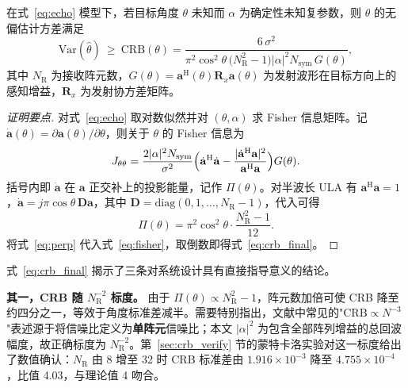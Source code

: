 \begin{theorem}[角度估计克拉美罗下界]
\label{thm:crb}
在式~\eqref{eq:echo} 模型下，若目标角度 $\theta$ 未知而 $\alpha$ 为确定性未知复参数，则 $\theta$ 的无偏估计方差满足
\begin{equation}
  \mathrm{Var}(\hat{\theta})\ \ge\ \mathrm{CRB}(\theta)
  =\frac{6\,\sigma^{2}}{\pi^{2}\cos^{2}\theta\,\bigl(N_{\mathrm{R}}^{2}-1\bigr)\lvert\alpha\rvert^{2}N_{\mathrm{sym}}\,G(\theta)},
  \label{eq:crb_final}
\end{equation}
其中 $N_{\mathrm{R}}$ 为接收阵元数，$G(\theta)=\mathbf{a}^{\mathrm{H}}(\theta)\mathbf{R}_{x}\mathbf{a}(\theta)$ 为发射波形在目标方向上的感知增益，$\mathbf{R}_{x}$ 为发射协方差矩阵。
\end{theorem}

\begin{proof}[证明要点]
对式~\eqref{eq:echo} 取对数似然并对 $(\theta,\alpha)$ 求 Fisher 信息矩阵。记 $\dot{\mathbf{a}}(\theta)=\partial\mathbf{a}(\theta)/\partial\theta$，则关于 $\theta$ 的 Fisher 信息为
\begin{equation}
  J_{\theta\theta}=\frac{2\lvert\alpha\rvert^{2}N_{\mathrm{sym}}}{\sigma^{2}}
  \Bigl(\dot{\mathbf{a}}^{\mathrm{H}}\dot{\mathbf{a}}-\frac{\lvert\dot{\mathbf{a}}^{\mathrm{H}}\mathbf{a}\rvert^{2}}{\mathbf{a}^{\mathrm{H}}\mathbf{a}}\Bigr)G(\theta).
  \label{eq:fisher}
\end{equation}
括号内即 $\dot{\mathbf{a}}$ 在 $\mathbf{a}$ 正交补上的投影能量，记作 $\Pi(\theta)$。对半波长 ULA 有 $\mathbf{a}^{\mathrm{H}}\mathbf{a}=1$，$\dot{\mathbf{a}}=j\pi\cos\theta\,\mathbf{D}\mathbf{a}$，其中 $\mathbf{D}=\mathrm{diag}(0,1,\ldots,N_{\mathrm{R}}-1)$，代入可得
\begin{equation}
  \Pi(\theta)=\pi^{2}\cos^{2}\theta\cdot\frac{N_{\mathrm{R}}^{2}-1}{12}.
  \label{eq:perp}
\end{equation}
将式~\eqref{eq:perp} 代入式~\eqref{eq:fisher}，取倒数即得式~\eqref{eq:crb_final}。
\end{proof}

式~\eqref{eq:crb_final} 揭示了三条对系统设计具有直接指导意义的结论。

\textbf{其一，CRB 随 $N_{\mathrm{R}}^{-2}$ 标度。} 由于 $\Pi(\theta)\propto N_{\mathrm{R}}^{2}-1$，阵元数加倍可使 CRB 降至约四分之一，等效于角度标准差减半。需要特别指出，文献中常见的"$\mathrm{CRB}\propto N^{-3}$"表述源于将信噪比定义为\textbf{单阵元}信噪比；本文 $\lvert\alpha\rvert^{2}$ 为包含全部阵列增益的总回波幅度，故正确标度为 $N_{\mathrm{R}}^{-2}$。第~\ref{sec:crb_verify} 节的蒙特卡洛实验对这一标度给出了数值确认：$N_{\mathrm{R}}$ 由 8 增至 32 时 CRB 标准差由 $1.916\times10^{-3}$ 降至 $4.755\times10^{-4}$，比值 4.03，与理论值 4 吻合。

